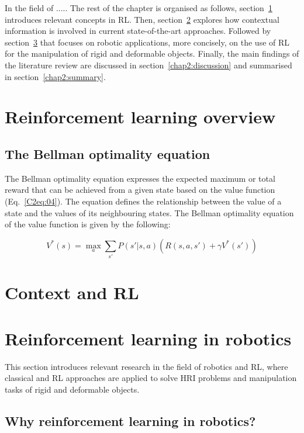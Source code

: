 
In the field of ..... The rest of the chapter is organised as follows, section~\ref{chap2:rl_overview} introduces relevant concepts in \ac{RL}. Then, section~\ref{chap2:context_rl} explores how contextual information is involved in current state-of-the-art approaches. Followed by section~\ref{chap2:rl_robotics} that focuses on robotic applications, more concisely, on the use of \ac{RL} for the manipulation of rigid and deformable objects. Finally, the main findings of the literature review are discussed in section~\ref{chap2:discussion} and summarised in section~\ref{chap2:summary}.   

\section{Reinforcement learning overview}
\label{chap2:rl_overview}


\subsection{The Bellman optimality equation}

The Bellman optimality equation expresses the expected maximum or total reward that can be achieved from a given state based on the value function (Eq.~\eqref{C2eq:04}). The equation defines the relationship between the value of a state and the values of its neighbouring states. The Bellman optimality equation of the value function is given by the following:

\begin{equation}\label{C2eq:04}
V^{*}(s)=\max\limits_{a}\sum_{s'}^{}P(s'| s,a)(R(s,a,s')+\gamma V^{*}(s'))
\end{equation}


\section{Context and RL}
\label{chap2:context_rl}



\section{Reinforcement learning in robotics}
\label{chap2:rl_robotics}
This section introduces relevant research in the field of robotics and \ac{RL}, where classical and RL approaches are applied to solve \ac{HRI} problems and manipulation tasks of rigid and deformable objects.

\subsection{Why reinforcement learning in robotics?}
\label{chap2:rl_robotics_why}


